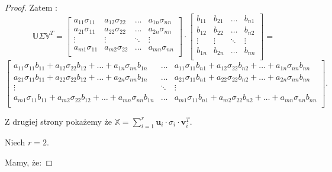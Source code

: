 \documentclass[12pt,a4paper]{report}
\begin{document}
\begin{proof}
Zatem :
$$\mathbb{U} \Sigma \mathbb{V}^T = \left[
        \begin{array}{cccc}
         a_{11} \sigma_{11} & a_{12} \sigma_{22} & \ldots & a_{1n} \sigma_{nn} \\
         a_{21} \sigma_{11} & a_{22} \sigma_{22} & \ldots & a_{2n} \sigma_{nn}\\
         \vdots & \vdots & \ddots & \vdots \\
         a_{m1} \sigma_{11} & a_{m2} \sigma_{22} & \ldots & a_{mn} \sigma_{nn} \\
         \end{array}
      \right] \cdot \left[
        \begin{array}{cccc}
         b_{11} & b_{21} & \ldots & b_{n1}  \\
         b_{12} & b_{22} & \ldots & b_{n2} \\
         \vdots & \vdots & \ddots & \vdots \\
         b_{1n} & b_{2n} & \ldots & b_{nn} \\
         \end{array}
      \right] = 
      $$
      $$\left[
        \begin{array}{ccc}
a_{11} \sigma_{11} b_{11} + a_{12} \sigma_{22} b_{12} + \ldots + a_{1n} \sigma_{nn} b_{1n} & \ldots &  a_{11} \sigma_{11} b_{n1} + a_{12} \sigma_{22} b_{n2} + \ldots + a_{1n} \sigma_{nn} b_{nn} \\
a_{21} \sigma_{11} b_{11} + a_{22} \sigma_{22} b_{12} + \ldots + a_{2n} \sigma_{nn} b_{1n} & \ldots & a_{21} \sigma_{11} b_{n1} + a_{22} \sigma_{22} b_{n2} + \ldots + a_{2n} \sigma_{nn} b_{nn} \\
         \vdots & \ddots & \vdots \\
a_{m1} \sigma_{11} b_{11} + a_{m2} \sigma_{22} b_{12} + \ldots + a_{mn} \sigma_{nn} b_{1n} & \ldots & a_{m1} \sigma_{11} b_{n1} + a_{m2} \sigma_{22} b_{n2} + \ldots + a_{mn} \sigma_{nn} b_{nn} \\
         \end{array}
      \right].$$
      
Z drugiej strony pokażemy że $\mathbb{X} = \sum_{i=1}^r \mathbf{u}_i \cdot\sigma_i \cdot \mathbf{v}_i^T$.

Niech $r=2$.

Mamy, że:


\end{proof}
\end{document}

